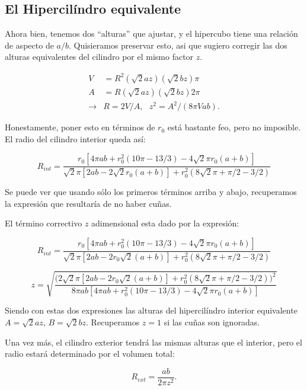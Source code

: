 \documentclass[letterpaperr,12pt]{article}
\begin{document}
\subsection{El Hipercilíndro equivalente}

Ahora bien, tenemos dos ``alturas'' que ajustar, y el
 hipercubo
tiene una relación de aspecto de $a/b$. Quisieramos
preservar esto, asi que sugiero corregir las dos alturas
equivalentes del cilindro por el mismo factor $z$.


\begin{align}
V &= R^2 (\sqrt{2} a z)(\sqrt{2} b z) \pi \\
A &= R (\sqrt{2} a z)(\sqrt{2} b z) 2  \pi \\
\rightarrow & R= 2V/A, \text{ } z^2=A^2/( 8\pi V a b).  
\end{align}

Honestamente, poner esto en términos de $r_0$ está bastante feo, pero no imposible.
El radio del cilindro interior queda así:

\begin{equation}
R_{int}=\frac{r_0 [ 4 \pi ab + r_0 ^2 (10 \pi -13/3) - 4\sqrt{2} \pi r_0 (a+b)]}
{\sqrt{2}\pi[2 ab- 2\sqrt{2} r_0 (a+b)] +r_0^2 (8\sqrt{2} \pi + \pi/2 -3/2)}
\end{equation}

Se puede ver que usando sólo los primeros términos arriba y abajo, 
recuperamos la expresión
que resultaría de no haber cuñas. 

El término correctivo $z$ adimensional esta dado por la expresión:

\begin{equation}
R_{int}=\frac{r_0 [ 4 \pi ab + r_0 ^2 (10 \pi -13/3) - 4 \sqrt{2}\pi r_0 (a+b)]}
{\sqrt{2}\pi[2 ab- 2r_0 \sqrt{2} (a+b)] +r_0^2 (8\sqrt{2} \pi + \pi/2 -3/2)}
\end{equation}

\begin{equation}
z=\sqrt{
\frac{\big( 2\sqrt{2}\pi[ 2 ab- 2r_0 \sqrt{2}(a+b)] +r_0^2 (8\sqrt{2} \pi + \pi/2 -3/2) \big)^2}
{8 \pi ab [4 \pi ab + r_0 ^2 (10 \pi -13/3) - 4 \sqrt{2} \pi r_0 (a+b)]}
}
\end{equation}

Siendo con estas dos expresiones las alturas del hipercilíndro interior equivalente
$A=\sqrt{2} a z$,  $B=\sqrt{2} b z$. Recuperamos $z=1$ si las cuñas son ignoradas.

Una vez más, el cilindro exterior tendrá las mismas alturas que el interior,
pero el radio estará determinado por el volumen total:

\begin{equation}
R_{ext}=\frac{ab}{2\pi z^2}.
\end{equation}
\end{document}
